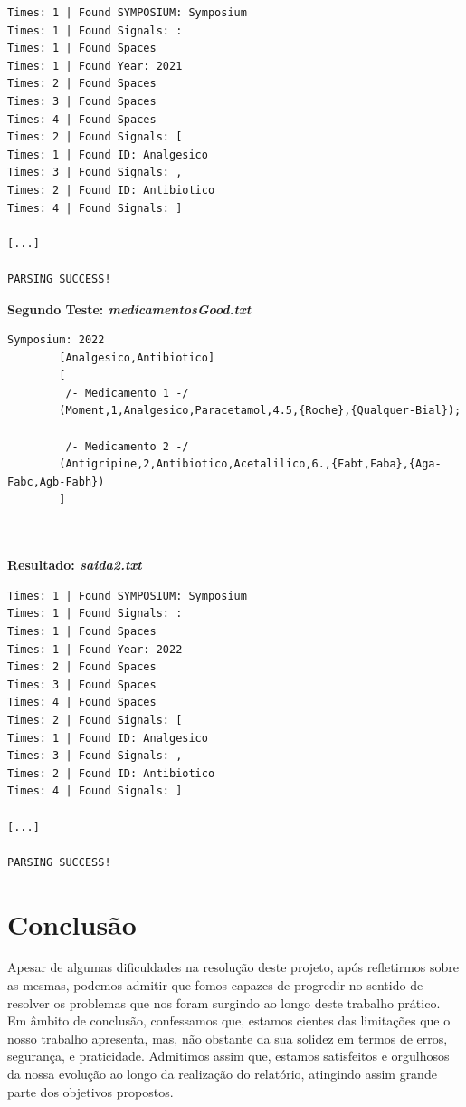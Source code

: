 \documentclass{article}
\begin{document}
\begin{lstlisting}[style=CStyle]
Times: 1 | Found SYMPOSIUM: Symposium
Times: 1 | Found Signals: :
Times: 1 | Found Spaces
Times: 1 | Found Year: 2021
Times: 2 | Found Spaces
Times: 3 | Found Spaces
Times: 4 | Found Spaces
Times: 2 | Found Signals: [
Times: 1 | Found ID: Analgesico
Times: 3 | Found Signals: ,
Times: 2 | Found ID: Antibiotico
Times: 4 | Found Signals: ]

[...]

PARSING SUCCESS!

\end{lstlisting}

\large\textbf{Segundo Teste: \emph{medicamentosGood.txt}}
\begin{lstlisting}[style=CStyle]
Symposium: 2022
		[Analgesico,Antibiotico]
		[
		 /- Medicamento 1 -/
		(Moment,1,Analgesico,Paracetamol,4.5,{Roche},{Qualquer-Bial});

		 /- Medicamento 2 -/
		(Antigripine,2,Antibiotico,Acetalilico,6.,{Fabt,Faba},{Aga-Fabc,Agb-Fabh})
		]



\end{lstlisting}

\normalsize\textbf{Resultado: \emph{saida2.txt}}

\begin{lstlisting}[style=CStyle]
Times: 1 | Found SYMPOSIUM: Symposium
Times: 1 | Found Signals: :
Times: 1 | Found Spaces
Times: 1 | Found Year: 2022
Times: 2 | Found Spaces
Times: 3 | Found Spaces
Times: 4 | Found Spaces
Times: 2 | Found Signals: [
Times: 1 | Found ID: Analgesico
Times: 3 | Found Signals: ,
Times: 2 | Found ID: Antibiotico
Times: 4 | Found Signals: ]

[...]

PARSING SUCCESS!

\end{lstlisting}

\vspace{2cm}

\section{Conclusão}
\hspace*{1.5em}Apesar de algumas dificuldades na resolução deste projeto, após refletirmos sobre as mesmas, podemos admitir que fomos capazes de progredir no sentido de resolver os problemas que nos foram surgindo ao longo deste trabalho prático.
Em âmbito de conclusão, confessamos que, estamos cientes das limitações que o nosso trabalho apresenta, mas, não obstante da sua solidez em termos de erros, segurança, e praticidade. Admitimos assim que, estamos satisfeitos e orgulhosos da nossa evolução ao longo da realização do relatório, atingindo assim grande parte dos objetivos propostos.
\end{document}
